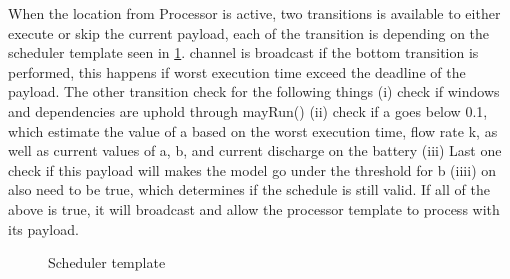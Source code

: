 When the location  from Processor is active, two transitions is available to either execute or skip the current payload, each of the transition is depending on the scheduler template seen in \cref{fig:smc_S}.  channel is broadcast if the bottom transition is performed, this happens if worst execution time exceed the deadline of the payload. The other transition check for the following things (i) check if windows and dependencies are uphold through mayRun() (ii) check if a goes below 0.1, which estimate the value of a based on the worst execution time, flow rate k, as well as current values of a, b, and current discharge on the battery (iii) Last one check if this payload will makes the model go under the threshold for b (iiii) on also need to be true, which determines if the schedule is still valid. If all of the above is true, it will broadcast  and allow the processor template to process with its payload.

\begin{figure}[H]
	\centering
	\caption{Scheduler template}
	\label{fig:smc_S}
\end{figure}

